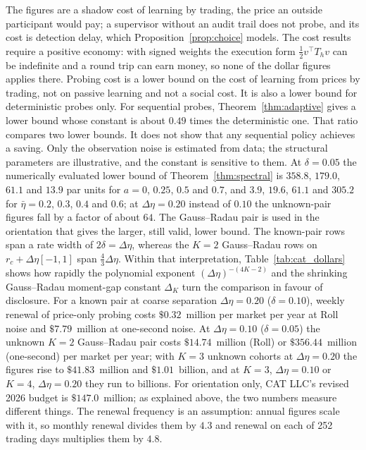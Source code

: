 The figures are a shadow cost of learning by trading, the price an outside participant would pay; a supervisor without an audit trail does not probe, and its cost is detection delay, which Proposition~\ref{prop:choice} models. The cost results require a positive economy: with signed weights the execution form $\tfrac12v^\top T_hv$ can be indefinite and a round trip can earn money, so none of the dollar figures applies there. Probing cost is a lower bound on the cost of learning from prices by trading, not on passive learning and not a social cost. It is also a lower bound for deterministic probes only. For sequential probes, Theorem~\ref{thm:adaptive} gives a lower bound whose constant is about $0.49$ times the deterministic one. That ratio compares two lower bounds. It does not show that any sequential policy achieves a saving. Only the observation noise is estimated from data; the structural parameters are illustrative, and the constant is sensitive to them. At $\delta=0.05$ the numerically evaluated lower bound of Theorem~\ref{thm:spectral} is $358.8$, $179.0$, $61.1$ and $13.9$ par units for $a=0$, $0.25$, $0.5$ and $0.7$, and $3.9$, $19.6$, $61.1$ and $305.2$ for $\bar\eta=0.2$, $0.3$, $0.4$ and $0.6$; at $\Delta\eta=0.20$ instead of $0.10$ the unknown-pair figures fall by a factor of about $64$. The Gauss--Radau pair is used in the orientation that gives the larger, still valid, lower bound. The known-pair rows span a rate width of $2\delta=\Delta\eta$, whereas the $K=2$ Gauss--Radau rows on $r_c+\Delta\eta[-1,1]$ span $\tfrac43\Delta\eta$. Within that interpretation, Table~\ref{tab:cat_dollars} shows how rapidly the polynomial exponent $(\Delta\eta)^{-(4K-2)}$ and the shrinking Gauss--Radau moment-gap constant $\Delta_K$ turn the comparison in favour of disclosure. For a known pair at coarse separation $\Delta\eta=0.20$ ($\delta=0.10$), weekly renewal of price-only probing costs $\$0.32$~million per market per year at Roll noise and $\$7.79$~million at one-second noise. At $\Delta\eta=0.10$ ($\delta=0.05$) the unknown $K=2$ Gauss--Radau pair costs $\$14.74$~million (Roll) or $\$356.44$~million (one-second) per market per year; with $K=3$ unknown cohorts at $\Delta\eta=0.20$ the figures rise to $\$41.83$~million and $\$1.01$~billion, and at $K=3$, $\Delta\eta=0.10$ or $K=4$, $\Delta\eta=0.20$ they run to billions. For orientation only, CAT LLC's revised 2026 budget is $\$147.0$~million; as explained above, the two numbers measure different things. The renewal frequency is an assumption: annual figures scale with it, so monthly renewal divides them by $4.3$ and renewal on each of 252 trading days multiplies them by $4.8$.

